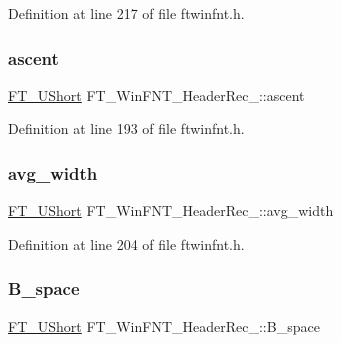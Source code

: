 Definition at line 217 of file ftwinfnt.\+h.

\mbox{\label{struct_f_t___win_f_n_t___header_rec___a99125a3ce627cd8295c50c6019ec2f42}} 
\subsubsection{\texorpdfstring{ascent}{ascent}}
{\footnotesize\ttfamily \mbox{\hyperlink{fttypes_8h_a937f6c17cf5ffd09086d8610c37b9f58}{F\+T\+\_\+\+U\+Short}} F\+T\+\_\+\+Win\+F\+N\+T\+\_\+\+Header\+Rec\+\_\+\+::ascent}



Definition at line 193 of file ftwinfnt.\+h.

\mbox{\label{struct_f_t___win_f_n_t___header_rec___a5f919b7a10577dc2a2bf19496a7a4366}} 
\subsubsection{\texorpdfstring{avg\_width}{avg\_width}}
{\footnotesize\ttfamily \mbox{\hyperlink{fttypes_8h_a937f6c17cf5ffd09086d8610c37b9f58}{F\+T\+\_\+\+U\+Short}} F\+T\+\_\+\+Win\+F\+N\+T\+\_\+\+Header\+Rec\+\_\+\+::avg\+\_\+width}



Definition at line 204 of file ftwinfnt.\+h.

\mbox{\label{struct_f_t___win_f_n_t___header_rec___aabd41a485124b6c4220fc4622525608e}} 
\subsubsection{\texorpdfstring{B\_space}{B\_space}}
{\footnotesize\ttfamily \mbox{\hyperlink{fttypes_8h_a937f6c17cf5ffd09086d8610c37b9f58}{F\+T\+\_\+\+U\+Short}} F\+T\+\_\+\+Win\+F\+N\+T\+\_\+\+Header\+Rec\+\_\+\+::\+B\+\_\+space}



